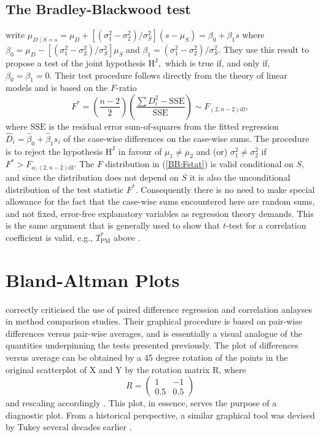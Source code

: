 \documentclass[12pt, a4paper]{report}
\theoremstyle{plain}
\theoremstyle{definition}
\theoremstyle{remark}
\begin{document}
\subsection*{The Bradley-Blackwood test}

\cite{BB89} write $\mu_{D \mid S=s} = \mu_D + [ ( \sigma^2_1 - \sigma^2_2) / \sigma^2_S ] (s - \mu_S) = \beta_0 + \beta_1 s$ where $\beta_0=\mu_D- [(\sigma^2_1-\sigma^2_2)/ \sigma^2_S] \mu_S$ and $\beta_1 = (\sigma^2_1 - \sigma^2_2 )/ \sigma^2_S.$ They use this result to propose a test of the joint hypothesis $\textrm{H}^\mathrm{J},$ which is true if, and only if, $\beta_0=\beta_1=0.$ Their test procedure follows directly from the theory of linear models \citep[for example]{Hogg} and is based on the $F$-ratio
\begin{equation}\label{BB:Fstat}
F^* = (\frac{n-2}{2}) (\frac{\sum {D_i^2} - \mathrm{SSE}}{\mathrm{SSE}}) \sim F_{(2,n-2)\textrm{df}} ,
\end{equation}
where $\mathrm{SSE}$ is the residual error sum-of-squares from the fitted regression $\hat{D}_i=\hat{\beta}_0 +\hat{\beta}_1 s_i$ of the case-wise differences on the case-wise sums. The procedure is to reject the hypothesis $\textrm{H}^\mathrm{J}$ in favour of $\mu_1\neq\mu_2$ and (or) $\sigma^2_1\neq\sigma^2_2$ if $F^* >  F_{\alpha,(2,n-2)\textrm{df}}.$ The $F$ distribution in (\ref{BB:Fstat}) is valid conditional on $S,$ and since the distribution does not depend on $S$ it is also the unconditional distribution of the test statistic $F^*.$ Consequently there is no need to make special allowance for the fact that the case-wise sums encountered here are random sums, and not fixed, error-free explanatory variables as regression theory demands.   This is the same argument that is generally used to show that $t$-test for a correlation coefficient is valid, e.g., $T^*_\mathrm{PM}$ above \citep[page 499]{Hogg}.

\section*{Bland-Altman Plots}

\citet{BA83} correctly criticised the use of paired difference regression and correlation anlayses in method comparison studies. Their graphical procedure is based on pair-wise differences versus pair-wise averages, and is essentially a visual analogue of the quantities underpinning the tests presented previously. The plot of differences versus average can be obtained by a 45 degree rotation of the points in the original  scatterplot of X and Y by the rotation matrix R, where \[R = \left(\begin{array}{cc}
1 & -1 \\ 
0.5 & 0.5
\end{array}\right) \] and rescaling accordingly \citep{newson2016rank}. This plot, in essence, serves the purpose of a diagnostic plot.
From a historical perspective, a similar graphical tool was devised by Tukey several decades earlier \citep{kozak2014including}.
\end{document}
